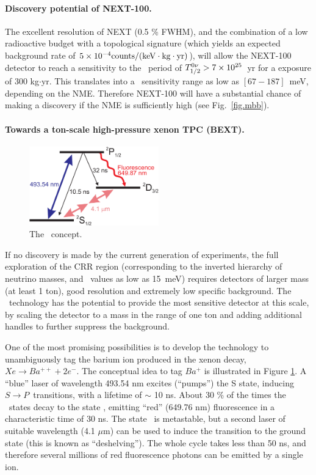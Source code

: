 \paragraph{Discovery potential of NEXT-100.}

The excellent resolution of NEXT (0.5 \% FWHM), and the combination of a low radioactive budget with a topological signature (which yields an expected background rate of $5 \times 10^{-4} \rm counts/(keV \cdot kg \cdot yr)$), will allow the NEXT-100 detector to reach a sensitivity to the \bbonu\ period of $T_{1/2}^{0\nu} > 7 \times 10^{25}$~yr for a exposure of 300 kg$\cdot$yr. This translates into a \mbb\ sensitivity range as low as $[67-187]$~meV, depending on the NME. Therefore NEXT-100 will have a substantial chance of making a discovery if the NME is sufficiently high (see Fig.~\ref{fig.mbb}). 

\paragraph{Towards a ton-scale high-pressure xenon TPC (BEXT).}

\begin{figure}
\centering
\includegraphics[width=0.50\textwidth]{img/levelscheme2.pdf}
\caption{The \BATA\ concept.} \label{fig.BATA}
\end{figure}

If no discovery is made by the current generation of experiments, the full exploration of the CRR region (corresponding to the inverted hierarchy of neutrino masses, and \mbb\ values as low as 15~meV) requires detectors of larger mass (at least 1 ton), good resolution and extremely low specific background. The \HPXE\ technology has the potential to provide the most sensitive detector at this scale, by scaling the detector to a mass in the range of one ton and adding additional handles to further suppress the background. 

One of the most promising possibilities is to develop the technology to unambiguously tag the barium ion produced in the xenon decay, $Xe \rightarrow Ba^{++} + 2 e^-$. The conceptual idea to tag $Ba^{+}$ is illustrated in Figure \ref{fig.BATA}. A ``blue'' laser of wavelength 493.54 nm excites (``pumps'') the S state, inducing $S \rightarrow P$~transitions, with a lifetime of $\sim$ 10 ns. About 30 \% of the times the \TwoP\ states decay to the state \TwoD, emitting ``red'' (649.76 nm) fluorescence in a characteristic time of 30 ns. The state \TwoD\ is metastable, but a second laser of suitable wavelength (4.1 $\mu$m) can be used to induce the transition to the ground state (this is known as ``deshelving'').  The whole cycle takes less than 50 ns, and therefore several millions of red fluorescence photons can be emitted by a single ion. 


